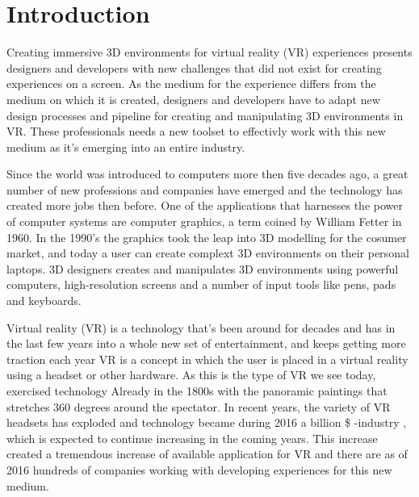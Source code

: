 
\chapter*{Introduction}
Creating immersive 3D environments for virtual reality (VR) experiences presents designers and developers with new challenges that did not exist for creating experiences on a screen. As the medium for the experience differs from the medium on which it is created, designers and developers have to adapt new design processes and pipeline for creating and manipulating 3D environments in VR. These professionals needs a new toolset to effectivly work with this new medium as it's emerging into an entire industry.\cite{VR_stats:4_predictions}

Since the world was introduced to computers more then five decades ago, a great number of new professions and companies have emerged and the technology has created more jobs then before. \cite{3D_history:2_allen_2017} One of the applications that harnesses the power of computer systems are computer graphics, a term coined by William Fetter in 1960. \cite{3D_history:graphics_2017} In the 1990's the graphics took the leap into 3D modelling for the cosumer market, and today a user can create complext 3D environments on their personal laptops. 3D designers creates and manipulates 3D environments using powerful computers, high-resolution screens and a number of input tools like pens, pads and keyboards.


Virtual reality (VR) is a technology that's been around for decades and has in the last few years into a whole new set of entertainment, and keeps getting more traction each year
\cite{VR:mazuryk1996virtual}
VR is a concept in which the user is placed in a virtual reality using a headset or other hardware. As this is the type of VR we see today, exercised technology Already in the 1800s with the panoramic paintings that stretches 360 degrees around the spectator. In recent years, the variety of VR headsets has exploded and technology became during 2016 a billion \$ -industry , which is expected to continue increasing in the coming years.
\cite{VR_stats:statista}
This increase created a tremendous increase of available application for VR and there are as of 2016 hundreds of companies working with developing experiences for this new medium.


